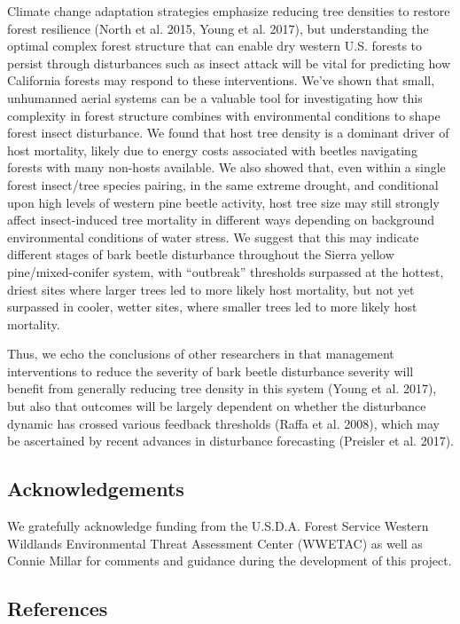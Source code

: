 \documentclass[]{article}
\begin{document}
Climate change adaptation strategies emphasize reducing tree densities
to restore forest resilience (North et al. 2015, Young et al. 2017), but
understanding the optimal complex forest structure that can enable dry
western U.S. forests to persist through disturbances such as insect
attack will be vital for predicting how California forests may respond
to these interventions. We've shown that small, unhumanned aerial
systems can be a valuable tool for investigating how this complexity in
forest structure combines with environmental conditions to shape forest
insect disturbance. We found that host tree density is a dominant driver
of host mortality, likely due to energy costs associated with beetles
navigating forests with many non-hosts available. We also showed that,
even within a single forest insect/tree species pairing, in the same
extreme drought, and conditional upon high levels of western pine beetle
activity, host tree size may still strongly affect insect-induced tree
mortality in different ways depending on background environmental
conditions of water stress. We suggest that this may indicate different
stages of bark beetle disturbance throughout the Sierra yellow
pine/mixed-conifer system, with ``outbreak'' thresholds surpassed at the
hottest, driest sites where larger trees led to more likely host
mortality, but not yet surpassed in cooler, wetter sites, where smaller
trees led to more likely host mortality.

Thus, we echo the conclusions of other researchers in that management
interventions to reduce the severity of bark beetle disturbance severity
will benefit from generally reducing tree density in this system (Young
et al. 2017), but also that outcomes will be largely dependent on
whether the disturbance dynamic has crossed various feedback thresholds
(Raffa et al. 2008), which may be ascertained by recent advances in
disturbance forecasting (Preisler et al. 2017).

\subsection{Acknowledgements}\label{acknowledgements}

We gratefully acknowledge funding from the U.S.D.A. Forest Service
Western Wildlands Environmental Threat Assessment Center (WWETAC) as
well as Connie Millar for comments and guidance during the development
of this project.

\subsection*{References}\label{references}
\end{document}
